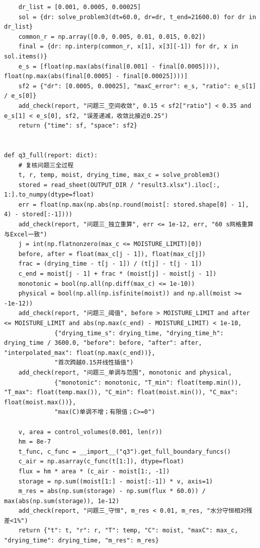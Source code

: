 \documentclass[withoutpreface,bwprint]{cumcm_thesis}
\begin{document}
\begin{appendices}
\begin{lstlisting}
    dr_list = [0.001, 0.0005, 0.00025]
    sol = {dr: solve_problem3(dt=60.0, dr=dr, t_end=21600.0) for dr in dr_list}
    common_r = np.array([0.0, 0.005, 0.01, 0.015, 0.02])
    final = {dr: np.interp(common_r, x[1], x[3][-1]) for dr, x in sol.items()}
    e_s = [float(np.max(abs(final[0.001] - final[0.0005]))), float(np.max(abs(final[0.0005] - final[0.00025])))]
    sf2 = {"dr": [0.0005, 0.00025], "maxC_error": e_s, "ratio": e_s[1] / e_s[0]}
    add_check(report, "问题三_空间收敛", 0.15 < sf2["ratio"] < 0.35 and e_s[1] < e_s[0], sf2, "误差递减，收敛比接近0.25")
    return {"time": sf, "space": sf2}


def q3_full(report: dict):
    # 复核问题三全过程
    t, r, temp, moist, drying_time, max_c = solve_problem3()
    stored = read_sheet(OUTPUT_DIR / "result3.xlsx").iloc[:, 1:].to_numpy(dtype=float)
    err = float(np.max(np.abs(np.round(moist[: stored.shape[0] - 1], 4) - stored[:-1])))
    add_check(report, "问题三_独立重算", err <= 1e-12, err, "60 s网格重算与Excel一致")
    j = int(np.flatnonzero(max_c <= MOISTURE_LIMIT)[0])
    before, after = float(max_c[j - 1]), float(max_c[j])
    frac = (drying_time - t[j - 1]) / (t[j] - t[j - 1])
    c_end = moist[j - 1] + frac * (moist[j] - moist[j - 1])
    monotonic = bool(np.all(np.diff(max_c) <= 1e-10))
    physical = bool(np.all(np.isfinite(moist)) and np.all(moist >= -1e-12))
    add_check(report, "问题三_阈值", before > MOISTURE_LIMIT and after <= MOISTURE_LIMIT and abs(np.max(c_end) - MOISTURE_LIMIT) < 1e-10,
              {"drying_time_s": drying_time, "drying_time_h": drying_time / 3600.0, "before": before, "after": after, "interpolated_max": float(np.max(c_end))},
              "首次跨越0.15并线性插值")
    add_check(report, "问题三_单调与范围", monotonic and physical,
              {"monotonic": monotonic, "T_min": float(temp.min()), "T_max": float(temp.max()), "C_min": float(moist.min()), "C_max": float(moist.max())},
              "max(C)单调不增；有限值；C>=0")

    v, area = control_volumes(0.001, len(r))
    hm = 8e-7
    t_func, c_func = __import__("q3").get_full_boundary_funcs()
    c_air = np.asarray(c_func(t[1:]), dtype=float)
    flux = hm * area * (c_air - moist[1:, -1])
    storage = np.sum((moist[1:] - moist[:-1]) * v, axis=1)
    m_res = abs(np.sum(storage) - np.sum(flux * 60.0)) / max(abs(np.sum(storage)), 1e-12)
    add_check(report, "问题三_守恒", m_res < 0.01, m_res, "水分守恒相对残差<1%")
    return {"t": t, "r": r, "T": temp, "C": moist, "maxC": max_c, "drying_time": drying_time, "m_res": m_res}



\end{lstlisting}
\end{appendices}
\end{document}
